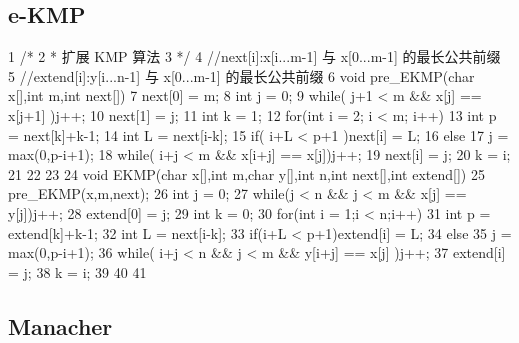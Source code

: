 \documentclass[11pt]{article}
\begin{document}
\subsection{e-KMP}

\begin{Code}
 1   /*
 2    * 扩展 KMP 算法
 3    */
 4   //next[i]:x[i...m-1] 与 x[0...m-1] 的最长公共前缀
 5   //extend[i]:y[i...n-1] 与 x[0...m-1] 的最长公共前缀
 6   void pre_EKMP(char x[],int m,int next[]){
 7       next[0] = m;
 8       int j = 0;
 9       while( j+1 < m && x[j] == x[j+1] )j++;
10       next[1] = j;
11       int k = 1;
12       for(int i = 2; i < m; i++){
13           int p = next[k]+k-1;
14           int L = next[i-k];
15           if( i+L < p+1 )next[i] = L;
16           else{
17               j = max(0,p-i+1);
18               while( i+j < m && x[i+j] == x[j])j++;
19               next[i] = j;
20               k = i;
21           }
22       }
23   }
24   void EKMP(char x[],int m,char y[],int n,int next[],int extend[]){
25       pre_EKMP(x,m,next);
26       int j = 0;
27       while(j < n && j < m && x[j] == y[j])j++;
28       extend[0] = j;
29       int k = 0;
30       for(int i = 1;i < n;i++){
31           int p = extend[k]+k-1;
32           int L = next[i-k];
33           if(i+L < p+1)extend[i] = L;
34           else{
35               j = max(0,p-i+1);
36               while( i+j < n && j < m && y[i+j] == x[j] )j++;
37               extend[i] = j;
38               k = i;
39           }
40       }
41   }
\end{Code}

\subsection{Manacher}

\end{document}
